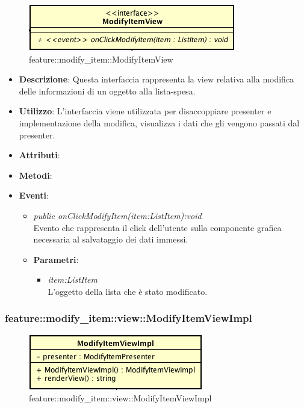 \label{feature::modify\_item::ModifyItemView}
\begin{figure}[ht]
	\centering
	\includegraphics[scale=0.5]{Sezioni/SottosezioniST/img/app/ModifyItemView.png}
	\caption{feature::modify\_item::ModifyItemView}
\end{figure}

\begin{itemize}
\item \textbf{Descrizione}: Questa interfaccia rappresenta la view relativa alla modifica delle informazioni di un oggetto alla lista-spesa.
\item \textbf{Utilizzo}: L'interfaccia viene utilizzata per disaccoppiare presenter e implementazione della modifica, visualizza i dati che gli vengono passati dal presenter.
\item \textbf{Attributi}: 
\item \textbf{Metodi}:
\item \textbf{Eventi}:
	\begin{itemize}
	\item \textit{public onClickModifyItem(item:ListItem):void}\\
	Evento che rappresenta il click dell'utente sulla componente grafica necessaria al salvataggio dei dati immessi.
			\item{\textbf{Parametri}: \begin{itemize}
			\item \textit{item:ListItem}\\
			L'oggetto della lista che è stato modificato.
			\end{itemize}}
	\end{itemize}
\end{itemize}

\subsubsection{feature::modify\_item::view::ModifyItemViewImpl}

\label{feature::modify\_item::view::ModifyItemViewImpl}
\begin{figure}[ht]
	\centering
	\includegraphics[scale=0.5]{Sezioni/SottosezioniST/img/app/ModifyItemViewImpl.png}
	\caption{feature::modify\_item::view::ModifyItemViewImpl}
\end{figure}

